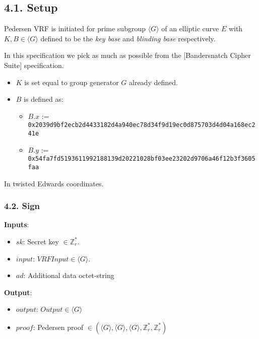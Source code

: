 \documentclass[
]{article}
\providecommand{\tightlist}{%
  \setlength{\itemsep}{0pt}\setlength{\parskip}{0pt}}
\begin{document}
\hypertarget{setup-1}{%
\subsection{4.1. Setup}\label{setup-1}}

Pedersen VRF is initiated for prime subgroup \(\langle G \rangle\) of an
elliptic curve \(E\) with \(K, B \in \langle G \rangle\) defined to be
the \emph{key base} and \emph{blinding base} respectively.

In this specification we pick as much as possible from the
{[}Bandersnatch Cipher Suite{]} specification.

\begin{itemize}
\tightlist
\item
  \(K\) is set equal to group generator \(G\) already defined.
\item
  \(B\) is defined as:

  \begin{itemize}
  \tightlist
  \item
    \(B.x\) :=
    \texttt{0x2039d9bf2ecb2d4433182d4a940ec78d34f9d19ec0d875703d4d04a168ec241e}
  \item
    \(B.y\) :=
    \texttt{0x54fa7fd5193611992188139d20221028bf03ee23202d9706a46f12b3f3605faa}
  \end{itemize}
\end{itemize}

In twisted Edwards coordinates.

\hypertarget{sign-1}{%
\subsubsection{4.2. Sign}\label{sign-1}}

\textbf{Inputs}:

\begin{itemize}
\tightlist
\item
  \(sk\): Secret key \(\in \mathbb{Z}^*_r\).
\item
  \(input\): \(VRFInput \in \langle G \rangle\).
\item
  \(ad\): Additional data octet-string
\end{itemize}

\textbf{Output}:

\begin{itemize}
\tightlist
\item
  \(output\): \(Output \in \langle G \rangle\)
\item
  \(proof\): Pedersen proof
  \(\in (\langle G \rangle, \langle G \rangle, \langle G \rangle, \mathbb{Z}^*_r, \mathbb{Z}^*_r)\)
\end{itemize}
\end{document}
